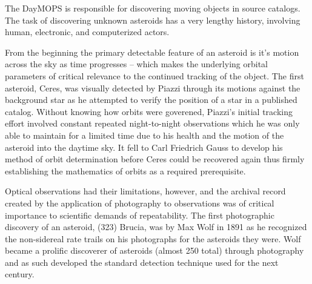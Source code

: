 

The DayMOPS is responsible for discovering moving objects in source
catalogs.  The task of discovering unknown asteroids has a very
lengthy history, involving human, electronic, and computerized actors.

From the beginning the primary detectable feature of an asteroid is
it's motion across the sky as time progresses -- which makes the
underlying orbital parameters of critical relevance to the continued
tracking of the object.  The first asteroid, Ceres, was visually
detected by Piazzi \citep{1802QB378} through its motions
against the background star as he attempted to verify the position of
a star in a published catalog.  Without knowing how orbits were
goverened, Piazzi's initial tracking effort involved constant repeated
night-to-night observations which he was only able to maintain for a
limited time due to his health and the motion of the asteroid into the
daytime sky.  It fell to Carl Friedrich Gauss to develop his method of
orbit determination before Ceres could be recovered again thus firmly
establishing the mathematics of orbits as a required prerequisite.

Optical observations had their limitations, however, and the archival
record created by the application of photography to observations was
of critical importance to scientific demands of repeatability.  The
first photographic discovery of an asteroid, (323) Brucia, was by Max
Wolf in 1891 \citep{1892AN} as he recognized the
non-sidereal rate trails on his photographs for the asteroids they
were.  Wolf became a prolific discoverer of asteroids (almost 250
total) through photography and as such developed the standard
detection technique used for the next century.

